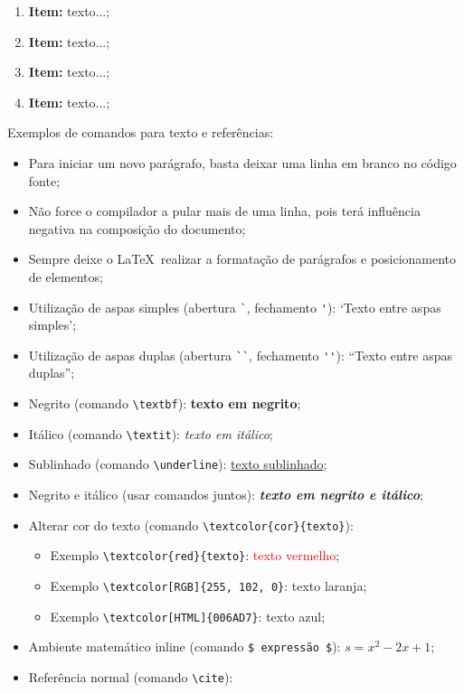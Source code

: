 \begin{enumerate}
	\item \textbf{Item:} texto...;
	\item \textbf{Item:} texto...;
	\item \textbf{Item:} texto...;
	\item \textbf{Item:} texto...;
\end{enumerate}


Exemplos de comandos para texto e referências:

\begin{itemize}
	\item Para iniciar um novo parágrafo, basta deixar uma linha em branco no código fonte;
	\item Não force o compilador a pular mais de uma linha, pois terá influência negativa na composição do documento;
	\item Sempre deixe o \LaTeX\ realizar a formatação de parágrafos e posicionamento de elementos;
	\item Utilização de aspas simples (abertura \verb|`|, fechamento \verb|'|): `Texto entre aspas simples';
	\item Utilização de aspas duplas (abertura \verb|``|, fechamento \verb|''|): ``Texto entre aspas duplas'';
	\item Negrito (comando \verb|\textbf|): \textbf{texto em negrito};
	\item Itálico (comando \verb|\textit|): \textit{texto em itálico};
	\item Sublinhado (comando \verb|\underline|): \underline{texto sublinhado};
	\item Negrito e itálico (usar comandos juntos): \textbf{\textit{texto em negrito e itálico}};
	\item Alterar cor do texto (comando \verb|\textcolor{cor}{texto}|):
	\begin{itemize}
		\item Exemplo \verb|\textcolor{red}{texto}|: \textcolor{red}{texto vermelho};
		\item Exemplo \verb|\textcolor[RGB]{255, 102, 0}|: \textcolor[RGB]{255, 102, 0}{texto laranja};
		\item Exemplo \verb|\textcolor[HTML]{006AD7}|: \textcolor[HTML]{006AD7}{texto azul};
	\end{itemize}
	\item Ambiente matemático inline (comando \verb|$ expressão $|): $s = x^2-2x +1$;
	\item Referência normal (comando \verb|\cite|):
	\begin{itemize}

\end{itemize}
\end{itemize}
